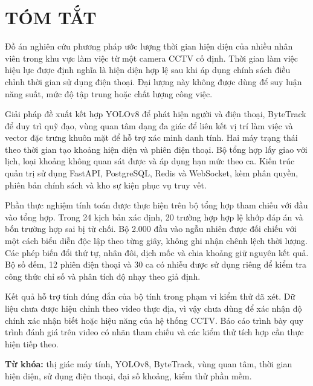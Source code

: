 \section*{TÓM TẮT}
Đồ án nghiên cứu phương pháp ước lượng thời gian hiện diện của nhiều nhân viên trong khu vực làm việc từ một camera CCTV cố định. Thời gian làm việc hiệu lực được định nghĩa là hiện diện hợp lệ sau khi áp dụng chính sách điều chỉnh thời gian sử dụng điện thoại. Đại lượng này không được dùng để suy luận năng suất, mức độ tập trung hoặc chất lượng công việc.

Giải pháp đề xuất kết hợp YOLOv8 để phát hiện người và điện thoại, ByteTrack để duy trì quỹ đạo, vùng quan tâm dạng đa giác để liên kết vị trí làm việc và vector đặc trưng khuôn mặt để hỗ trợ xác minh danh tính. Hai máy trạng thái theo thời gian tạo khoảng hiện diện và phiên điện thoại. Bộ tổng hợp lấy giao với lịch, loại khoảng không quan sát được và áp dụng hạn mức theo ca. Kiến trúc quản trị sử dụng FastAPI, PostgreSQL, Redis và WebSocket, kèm phân quyền, phiên bản chính sách và kho sự kiện phục vụ truy vết.

Phần thực nghiệm tính toán được thực hiện trên bộ tổng hợp tham chiếu với đầu vào tổng hợp. Trong 24 kịch bản xác định, 20 trường hợp hợp lệ khớp đáp án và bốn trường hợp sai bị từ chối. Bộ 2.000 đầu vào ngẫu nhiên được đối chiếu với một cách biểu diễn độc lập theo từng giây, không ghi nhận chênh lệch thời lượng. Các phép biến đổi thứ tự, nhân đôi, dịch mốc và chia khoảng giữ nguyên kết quả. Bộ số đếm, 12 phiên điện thoại và 30 ca có nhiễu được sử dụng riêng để kiểm tra công thức chỉ số và phân tích độ nhạy theo giả định.

Kết quả hỗ trợ tính đúng đắn của bộ tính trong phạm vi kiểm thử đã xét. Dữ liệu chưa được hiệu chỉnh theo video thực địa, vì vậy chưa dùng để xác nhận độ chính xác nhận biết hoặc hiệu năng của hệ thống CCTV. Báo cáo trình bày quy trình đánh giá trên video có nhãn tham chiếu và các kiểm thử tích hợp cần thực hiện tiếp theo.

\textbf{Từ khóa:} thị giác máy tính, YOLOv8, ByteTrack, vùng quan tâm, thời gian hiện diện, sử dụng điện thoại, đại số khoảng, kiểm thử phần mềm.
\clearpage
